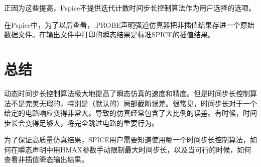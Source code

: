 正因为这些提高，Pspice不提供迭代计数时间步长控制算法作为用户选择的选项。

在Pspice中，为了以后查看，.PROBE声明强迫仿真器把非插值结果存进一个原始数据文件。在输出文件中打印的瞬态结果是标准SPICE的插值结果。

\section{总结}
动态时间步长控制算法极大地提高了瞬态仿真的速度和精度。但是时间步长控制算法不是完美无瑕的，特别是（默认的）局部截断误差。很常见，时间步长对于一个给定的电路响应变得非常大。导致的仿真经常包含了大比例的误差。有时候，时间步长会变得足够大，将完全跳过电路的重要行为。

为了保证高质量仿真结果，SPICE用户需要知道使用哪一个时间步长控制算法，如何在瞬态声明中用HMAX参数手动限制最大时间步长，以及当可行的时候，如何查看非插值瞬态输出结果。



